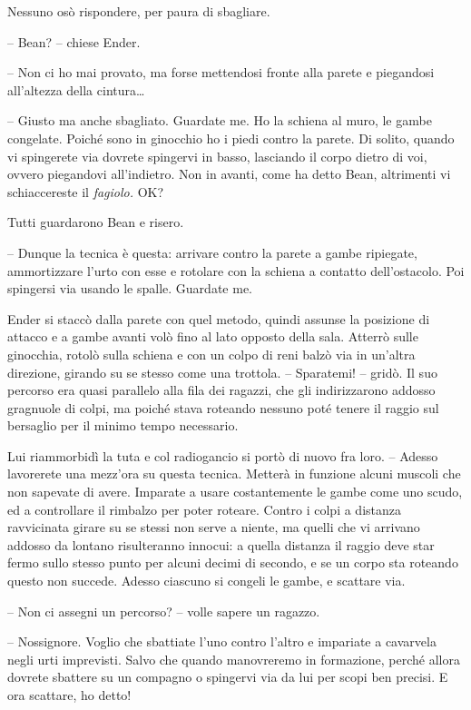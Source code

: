 {Nessuno osò rispondere, per paura di sbagliare.}

{-- Bean? -- chiese Ender.}

{-- Non ci ho mai provato, ma forse mettendosi fronte alla parete e
	piegandosi all'altezza della cintura\ldots{}}

{-- Giusto ma anche sbagliato. Guardate me. Ho la schiena al muro, le
	gambe congelate. Poiché sono in ginocchio ho i piedi contro la parete.
	Di solito, quando vi spingerete via dovrete spingervi in basso,
	lasciando il corpo dietro di voi, ovvero piegandovi all'indietro. Non in
	avanti, come ha detto Bean, altrimenti vi schiaccereste il
	\emph{fagiolo.} OK?}

{Tutti guardarono Bean e risero.}

{-- Dunque la tecnica è questa: arrivare contro la parete a gambe
	ripiegate, ammortizzare l'urto con esse e rotolare con la schiena a
	contatto dell'ostacolo. Poi spingersi via usando le spalle. Guardate
	me.}

{Ender si staccò dalla parete con quel metodo, quindi assunse la
	posizione di attacco e a gambe avanti volò fino al lato opposto della
	sala. Atterrò sulle ginocchia, rotolò sulla schiena e con un colpo di
	reni balzò via in un'altra direzione, girando su se stesso come una
	trottola. -- Sparatemi! -- gridò. Il suo percorso era quasi parallelo
	alla fila dei ragazzi, che gli indirizzarono addosso gragnuole di colpi,
	ma poiché stava roteando nessuno poté tenere il raggio sul bersaglio per
	il minimo tempo necessario.}

{Lui riammorbidì la tuta e col radiogancio si portò di nuovo fra loro.
	-- Adesso lavorerete una mezz'ora su questa tecnica. Metterà in funzione
	alcuni muscoli che non sapevate di avere. Imparate a usare costantemente
	le gambe come uno scudo, ed a controllare il rimbalzo per poter roteare.
	Contro i colpi a distanza ravvicinata girare su se stessi non serve a
	niente, ma quelli che vi arrivano addosso da lontano risulteranno
	innocui: a quella distanza il raggio deve star fermo sullo stesso punto
	per alcuni decimi di secondo, e se un corpo sta roteando questo non
	succede. Adesso ciascuno si congeli le gambe, e scattare via.}

{-- Non ci assegni un percorso? -- volle sapere un ragazzo.}

{-- Nossignore. Voglio che sbattiate l'uno contro l'altro e impariate a
	cavarvela negli urti imprevisti. Salvo che quando manovreremo in
	formazione, perché allora dovrete sbattere su un compagno o spingervi
	via da lui per scopi ben precisi. E ora scattare, ho detto!}

